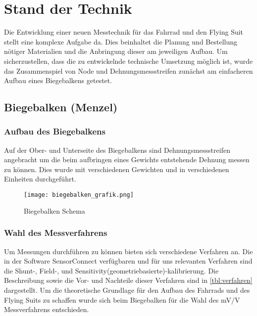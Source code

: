 \chapter{Stand der Technik}
Die Entwicklung einer neuen Messtechnik für das Fahrrad und den Flying Suit stellt eine komplexe Aufgabe da.
Dies beinhaltet die Planung und Bestellung nötiger Materialien und die Anbringung dieser am jeweiligen Aufbau.
Um sicherzustellen, dass die zu entwickelnde technische Umsetzung möglich ist, wurde das Zusammenspiel von Node und Dehnungsmessstreifen zunächst am einfacheren Aufbau eines Biegebalkens getestet.


\section{Biegebalken (Menzel)}
\subsection{Aufbau des Biegebalkens}
Auf der Ober- und Unterseite des Biegebalkens sind Dehnungsmessstreifen angebracht um die beim aufbringen eines Gewichts entstehende Dehnung messen zu können.
Dies wurde mit verschiedenen Gewichten und in verschiedenen Einheiten durchgeführt.
\begin{figure}[h]
    \begin{center}
        \texttt{[image: biegebalken\_grafik.png]}
        \caption[Biegebalken Schema (Abbildungsverzeichnis)]{Biegebalken Schema
        }
        \label{fig:biegebalkenschema}
    \end{center}
\end{figure}

\subsection{Wahl des Messverfahrens}
Um Messungen durchführen zu können bieten sich verschiedene Verfahren an.
Die in der Software SensorConnect verfügbaren und für uns relevanten Verfahren sind die Shunt-, Field-, und Sensitivity(geometriebasierte)-kalibrierung.
Die Beschreibung sowie die Vor- und Nachteile dieser Verfahren sind in \ref{tbl:verfahren}  dargestellt.
Um die theoretische Grundlage für den Aufbau des Fahrrads und des Flying Suits zu schaffen wurde sich beim Biegebalken für die Wahl des mV/V Messverfahrens entschieden.

